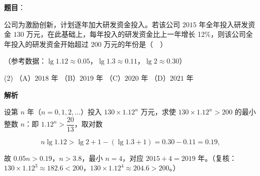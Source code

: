 \begin{answer}

\textbf{题目}：

公司为激励创新，计划逐年加大研发资金投入。若该公司 \(2015\) 年全年投入研发资金 \(130\) 万元，在此基础上，每年投入的研发资金比上一年增长 12\%，则该公司全年投入的研发资金开始超过 \(200\) 万元的年份是（　）

（参考数据：\(\lg 1.12\approx 0.05\)，\(\lg 1.3\approx 0.11\)，\(\lg 2\approx 0.30\)）

\begin{gkopts}(2)
\task （A）\(2018\) 年
\task （B）\(2019\) 年
\task （C）\(2020\) 年
\task （D）\(2021\) 年
\end{gkopts}

\textbf{解析}

设第 \(n\) 年（\(n=0,1,2,\dots\)）投入 \(130\times1.12^{n}\) 万元，求使 \(130\times1.12^{n}>200\) 的最小整数 \(n\)：即 \(1.12^{n}>\dfrac{20}{13}\)，取对数

\nopagebreak[4]
\[
n\lg 1.12>\lg 2+1-(\lg 1.3+1)=0.30-0.11=0.19,
\]

故 \(0.05n>0.19\)，\(n>3.8\)，最小 \(n=4\)，对应 \(2015+4=2019\) 年。（复核：\(130\times1.12^{3}\approx182.6<200\)，\(130\times1.12^{4}\approx204.6>200\)。）


\end{answer}

